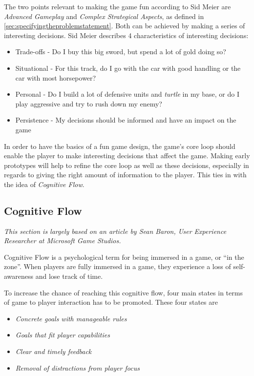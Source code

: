 The two points relevant to making the game fun according to Sid Meier are \textit{Advanced Gameplay} and \textit{Complex Strategical Aspects}, as defined in \ref{sec:specifyingtheproblemstatement}.
Both can be achieved by making a series of interesting decisions.
Sid Meier describes 4 characteristics of interesting decisions: 
\begin{itemize}
	\item Trade-offs - Do I buy this big sword, but spend a lot of gold doing so?
	\item Situational - For this track, do I go with the car with good handling or the car with most horsepower?
	\item Personal - Do I build a lot of defensive units and \textit{turtle} in my base, or do I play aggressive and try to rush down my enemy?
	\item Persistence - My decisions should be informed and have an impact on the game
\end{itemize}

In order to have the basics of a fun game design, the game's core loop should enable the player to make interesting decisions that affect the game.
Making early prototypes will help to refine the core loop as well as these decisions, especially in regards to giving the right amount of information to the player.
This ties in with the idea of \textit{Cognitive Flow}.

\subsection{Cognitive Flow}
\emph{This section is largely based on an article by Sean Baron, User Experience Researcher at Microsoft Game
Studios\cite{baron}.}

Cognitive Flow is a psychological term for being immersed in a game, or ``in the zone''.
When players are fully immersed in a game, they experience a loss of self-awareness and lose track of time.

To increase the chance of reaching this cognitive flow, four main states in terms of game to player interaction has to
be promoted.  
These four states are 
\begin{itemize}
    \item \emph{Concrete goals with manageable rules}
    \item \emph{Goals that fit player capabilities}
    \item \emph{Clear and timely feedback}
    \item \emph{Removal of distractions from player focus}
\end{itemize}

